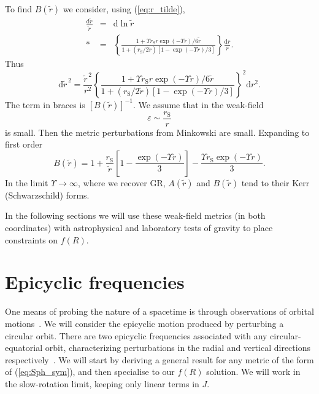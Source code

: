 \documentclass[aps,prd,amsfonts,amssymb,amsmath,nofootinbib,reprint,showpacs]{revtex4-1}
\newcommand{\eqnref}[1]{(\ref{eq:#1})}
\newcommand{\sub}[1]{\ensuremath{_\text{#1}}}
\newcommand{\dd}{\ensuremath{\text{d}}}
\begin{document}
To find $B(\widetilde{r})$ we consider, using \eqnref{r_tilde},
\begin{eqnarray}
\frac{\dd \widetilde{r}}{\widetilde{r}} & = & \dd \ln \widetilde{r} \nonumber \\*
 & = & \left\{\frac{1 + {\Upsilon r\sub{S}r\exp(-\Upsilon r)}/{6\widetilde{r}}}{1 + ({r\sub{S}}/{2\widetilde{r}})\left[1 - {\exp(-\Upsilon r)}/{3}\right]}\right\}\frac{\dd r}{r}.
\end{eqnarray}
Thus
\begin{equation}
\dd \widetilde{r}^{\,2} = \frac{\widetilde{r}^{\,2}}{r^2}\left\{\frac{1 + {\Upsilon r\sub{S}r\exp(-\Upsilon r)}/{6\widetilde{r}}}{1 + ({r\sub{S}}/{2\widetilde{r}})\left[1 - {\exp(-\Upsilon r)}/{3}\right]}\right\}^2 \dd r^2.
\end{equation}
The term in braces is $\left[B(\widetilde{r})\right]^{-1}$. We assume that in the weak-field
\begin{equation}
\varepsilon \sim \frac{r\sub{S}}{r}
\end{equation}
is small. Then the metric perturbations from Minkowski are small. Expanding to first order~\cite{Olmo2007c}
\begin{equation}
B(\widetilde{r})  = 1 + \frac{r\sub{S}}{\widetilde{r}}\left[1 - \frac{\exp(-\Upsilon r )}{3}\right] - \frac{\Upsilon r\sub{S} \exp(-\Upsilon r)}{3}.
\label{eq:B_metric}
\end{equation}
In the limit $\Upsilon \rightarrow \infty$, where we recover GR, $A(\widetilde{r})$ and $B(\widetilde{r})$ tend to their Kerr (Schwarzschild) forms.

In the following sections we will use these weak-field metrics (in both coordinates) with astrophysical and laboratory tests of gravity to place constraints on $f(R)$.

\section{Epicyclic frequencies\label{sec:Epicycle}}

One means of probing the nature of a spacetime is through observations of orbital motions~\cite{Gair2008a}. We will consider the epicyclic motion produced by perturbing a circular orbit. There are two epicyclic frequencies associated with any circular-equatorial orbit, characterizing perturbations in the radial and vertical directions respectively~\cite{Binney1987}. We will start by deriving a general result for any metric of the form of \eqnref{Sph_sym}, and then specialise to our $f(R)$ solution. We will work in the slow-rotation limit, keeping only linear terms in $J$.
\end{document}
